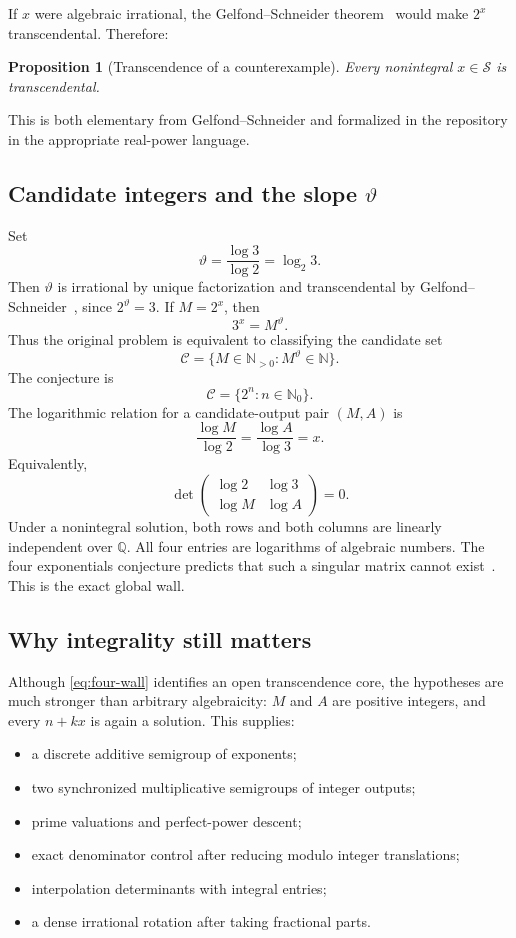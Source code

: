 \documentclass[11pt,oneside]{article}
\newtheorem{proposition}[theorem]{Proposition}
\theoremstyle{definition}
\theoremstyle{remark}
\newcommand{\N}{\mathbb N}
\newcommand{\Nzero}{\mathbb N_0}
\newcommand{\Q}{\mathbb Q}
\newcommand{\Sol}{\mathcal S}
\newcommand{\Cand}{\mathcal C}
\begin{document}
If $x$ were algebraic irrational, the Gelfond--Schneider theorem~\cite{Gelfond1960,Lang1966} would make $2^x$
transcendental.  Therefore:

\begin{proposition}[Transcendence of a counterexample]\label{prop:x-trans}
Every nonintegral $x\in\Sol$ is transcendental.
\end{proposition}

This is both elementary from Gelfond--Schneider and formalized in the repository in the
appropriate real-power language.

\subsection{Candidate integers and the slope \texorpdfstring{$\vartheta$}{vartheta}}

Set
\[
  \vartheta=\frac{\log 3}{\log 2}=\log_2 3.
\]
Then $\vartheta$ is irrational by unique factorization and transcendental by
Gelfond--Schneider~\cite{Gelfond1960}, since $2^{\vartheta}=3$.  If $M=2^x$, then
\[
  3^x=M^{\vartheta}.
\]
Thus the original problem is equivalent to classifying the candidate set
\[
 \Cand=\{M\in\N_{>0}:M^{\vartheta}\in\N\}.
\]
The conjecture is
\[
  \Cand=\{2^n:n\in\Nzero\}.
\]
The logarithmic relation for a candidate-output pair $(M,A)$ is
\[
 \frac{\log M}{\log 2}=\frac{\log A}{\log 3}=x.
\]
Equivalently,
\[
 \det\begin{pmatrix}
   \log 2&\log 3\\
   \log M&\log A
 \end{pmatrix}=0.                                      \tag{2.1}\label{eq:four-wall}
\]
Under a nonintegral solution, both rows and both columns are linearly independent over
$\Q$.  All four entries are logarithms of algebraic numbers.  The four exponentials
conjecture predicts that such a singular matrix cannot exist~\cite{Waldschmidt2003,Waldschmidt2005}.  This is the exact global wall.

\subsection{Why integrality still matters}

Although \eqref{eq:four-wall} identifies an open transcendence core, the hypotheses are much
stronger than arbitrary algebraicity: $M$ and $A$ are positive integers, and every
$n+kx$ is again a solution.  This supplies:

\begin{itemize}
\item a discrete additive semigroup of exponents;
\item two synchronized multiplicative semigroups of integer outputs;
\item prime valuations and perfect-power descent;
\item exact denominator control after reducing modulo integer translations;
\item interpolation determinants with integral entries;
\item a dense irrational rotation after taking fractional parts.
\end{itemize}
\end{document}
